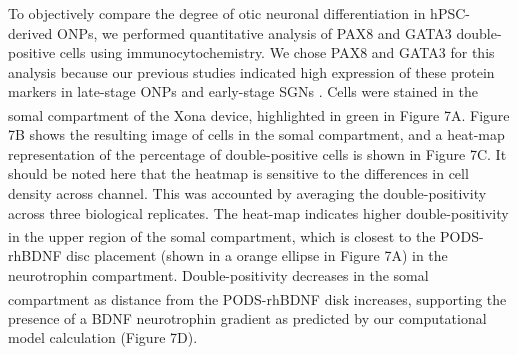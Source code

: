 \documentclass[review]{elsarticle}
\begin{document}
To objectively compare the degree of otic neuronal differentiation in hPSC-derived ONPs, we performed quantitative analysis of PAX8 and GATA3 double-positive cells using immunocytochemistry. We chose PAX8 and GATA3 for this analysis because our previous studies indicated high expression of these protein markers in late-stage ONPs and early-stage SGNs \cite{Heuer2021,Chang2020, Matsuoka2017}. Cells were stained in the somal compartment of the Xona\textsuperscript{\texttrademark} device, highlighted in green in Figure 7A. Figure 7B shows the resulting image of cells in the somal compartment, and a heat-map representation of the percentage of double-positive cells is shown in Figure 7C.
It should be noted here that the heatmap is sensitive to the differences in cell density across channel. This was accounted by averaging the double-positivity across three biological replicates. The heat-map indicates higher double-positivity in the upper region of the somal compartment, which is closest to the PODS\textsuperscript{\textregistered}-rhBDNF disc placement (shown in a orange ellipse in Figure 7A) in the neurotrophin compartment. Double-positivity decreases in the somal compartment as distance from the PODS\textsuperscript{\textregistered}-rhBDNF disk increases, supporting the presence of a BDNF neurotrophin gradient as predicted by our computational model calculation (Figure 7D).
\end{document}

